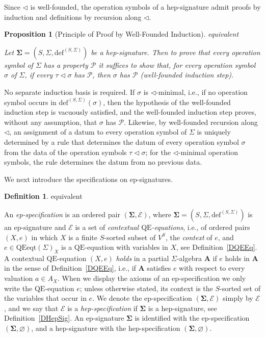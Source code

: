 \documentclass[a4paper, reqno]{amsbook}
\makeatletter
\newcommand{\sig}[1]{\mathbf{#1}}             %
\newcommand{\spec}[1]{\boldsymbol{\mathcal{#1}}} %
\newcommand{\QE}{\mathrm{QE}}
\theoremstyle{plain}
\newtheorem{proposition}[theorem]{Proposition}
\theoremstyle{definition}
\newtheorem{definition}[theorem]{Definition}
\newcommand*{\CA@leanpending}{}
\newcommand*{\CA@leanrelation}{}
\newcommand*{\lean}[2]{%
  \ifcsname\string\color@lean@#1\endcsname\else
    \PackageError{main}{Unknown relation `#1' in \string\lean}{Use equivalent, weaker or stronger.}%
  \fi
  \gdef\CA@leanrelation{#1}%
  \gdef\CA@leanpending{#2}}
\makeatother
\begin{document}
Since $\lhd$ is well-founded, the operation symbols of a hep-signature admit proofs by induction and definitions by recursion along $\lhd$.

\begin{proposition}[Principle of Proof by Well-Founded Induction]\label{PWellFoundedInduction}\lean{equivalent}{HepSignature.symbol_induction}
Let $\sig{\Sigma}=(S,\Sigma,\mathrm{def}^{(S,\Sigma)})$ be a hep-signature.
Then to prove that every operation symbol of $\Sigma$ has a property $\mathcal{P}$ it suffices to show that, for every operation symbol $\sigma$ of $\Sigma$, if every $\tau\lhd\sigma$ has $\mathcal{P}$, then $\sigma$ has $\mathcal{P}$ (well-founded induction step).
\end{proposition}

No separate induction basis is required.
If $\sigma$ is $\lhd$-minimal, i.e., if no operation symbol occurs in $\mathrm{def}^{(S,\Sigma)}(\sigma)$, then the hypothesis of the well-founded induction step is vacuously satisfied, and the well-founded induction step proves, without any assumption, that $\sigma$ has $\mathcal{P}$.
Likewise, by well-founded recursion along $\lhd$, an assignment of a datum to every operation symbol of $\Sigma$ is uniquely determined by a rule that determines the datum of every operation symbol $\sigma$ from the data of the operation symbols $\tau\lhd\sigma$; for the $\lhd$-minimal operation symbols, the rule determines the datum from no previous data.

We next introduce the specifications on ep-signatures.

\begin{definition}\label{DEpSpec}\lean{equivalent}{EPSpecification}
An \emph{ep-specification} is an ordered pair $(\sig{\Sigma},\mathcal{E})$, where $\sig{\Sigma}=(S,\Sigma,\mathrm{def}^{(S,\Sigma)})$ is an ep-signature and $\mathcal{E}$ is a set of \emph{contextual $\QE$-equations}, i.e., of ordered pairs $(X,e)$ in which $X$ is a finite $S$-sorted subset of $V^{S}$, the \emph{context} of $e$, and $e\in\mathrm{QEeqt}(\Sigma)_{X}$ is a $\QE$-equation with variables in $X$, see Definition~\ref{DQEEq}.
A contextual $\QE$-equation $(X,e)$ \emph{holds} in a partial $\Sigma$-algebra $\mathbf{A}$ if $e$ holds in $\mathbf{A}$ in the sense of Definition~\ref{DQEEq}, i.e., if $\mathbf{A}$ satisfies $e$ with respect to every valuation $a\in A_{X}$.
When we display the axioms of an ep-specification we only write the $\QE$-equation $e$; unless otherwise stated, its context is the $S$-sorted set of the variables that occur in $e$.
We denote the ep-specification $(\sig{\Sigma},\mathcal{E})$ simply by $\spec{E}$, and we say that $\spec{E}$ is a \emph{hep-specification} if $\sig{\Sigma}$ is a hep-signature, see Definition~\ref{DHepSig}.
An ep-signature $\sig{\Sigma}$ is identified with the ep-specification $(\sig{\Sigma},\varnothing)$, and a hep-signature with the hep-specification $(\sig{\Sigma},\varnothing)$.
\end{definition}
\end{document}
